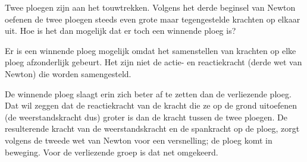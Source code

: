 \item Twee ploegen zijn aan het touwtrekken. Volgens het derde
beginsel van Newton oefenen de twee ploegen steeds even grote maar tegengestelde krachten op elkaar uit. Hoe is het dan mogelijk dat er toch een winnende ploeg is?
\begin{oplossing}
\newline
Er is een winnende ploeg mogelijk omdat het samenstellen van krachten op elke ploeg afzonderlijk gebeurt. Het zijn niet de actie- en reactiekracht (derde wet van Newton) die worden samengesteld. 

De winnende ploeg slaagt erin zich beter af te zetten dan de verliezende ploeg. Dat wil zeggen dat de reactiekracht van de kracht die ze op de grond uitoefenen (de weerstandskracht dus) groter is dan de kracht tussen de twee ploegen. De resulterende kracht van de weerstandskracht en de spankracht op de ploeg, zorgt volgens de tweede wet van Newton voor een versnelling; de ploeg komt in beweging. Voor de verliezende groep is dat net omgekeerd.  
\end{oplossing}